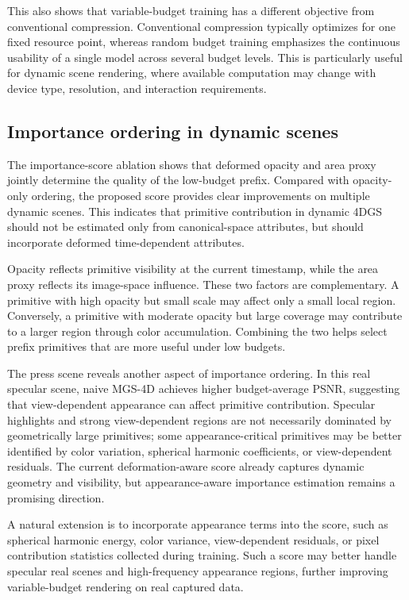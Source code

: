 \documentclass[pdflatex,sn-mathphys]{sn-jnl}
\begin{document}
This also shows that variable-budget training has a different objective from conventional compression. Conventional compression typically optimizes for one fixed resource point, whereas random budget training emphasizes the continuous usability of a single model across several budget levels. This is particularly useful for dynamic scene rendering, where available computation may change with device type, resolution, and interaction requirements.

\subsection{Importance ordering in dynamic scenes}

The importance-score ablation shows that deformed opacity and area proxy jointly determine the quality of the low-budget prefix. Compared with opacity-only ordering, the proposed score provides clear improvements on multiple dynamic scenes. This indicates that primitive contribution in dynamic 4DGS should not be estimated only from canonical-space attributes, but should incorporate deformed time-dependent attributes.

Opacity reflects primitive visibility at the current timestamp, while the area proxy reflects its image-space influence. These two factors are complementary. A primitive with high opacity but small scale may affect only a small local region. Conversely, a primitive with moderate opacity but large coverage may contribute to a larger region through color accumulation. Combining the two helps select prefix primitives that are more useful under low budgets.

The press scene reveals another aspect of importance ordering. In this real specular scene, naive MGS-4D achieves higher budget-average PSNR, suggesting that view-dependent appearance can affect primitive contribution. Specular highlights and strong view-dependent regions are not necessarily dominated by geometrically large primitives; some appearance-critical primitives may be better identified by color variation, spherical harmonic coefficients, or view-dependent residuals. The current deformation-aware score already captures dynamic geometry and visibility, but appearance-aware importance estimation remains a promising direction.

A natural extension is to incorporate appearance terms into the score, such as spherical harmonic energy, color variance, view-dependent residuals, or pixel contribution statistics collected during training. Such a score may better handle specular real scenes and high-frequency appearance regions, further improving variable-budget rendering on real captured data.
\end{document}
